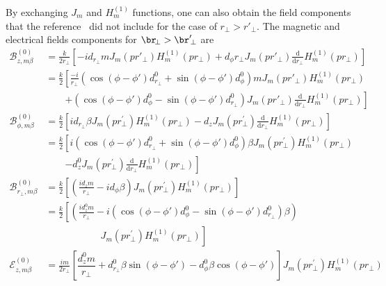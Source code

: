 \documentclass[]{report}
\begin{document}
By exchanging $J_m$ and $H_m^{(1)}$ functions, one can also obtain the field components that the reference~\cite{Klimov2004} did not include for the case of $ r\!_\perp>r'\!_\perp $. The magnetic and electrical fields components for $ \br\!_\perp>\br'\!_\perp $ are 
\begin{align}
\mathcal{B}_{z,m\beta}^{(0)} &= \frac{k}{2r\!_\perp}\left[-\! id_{r\!_\perp}m J_m(pr'\!\!_\perp)H_m^{(1)}(pr\!_\perp) \!+\! d_\phi r\!_\perp J_m(pr'\!_\perp) \frac{\mathrm{d}}{\mathrm{d}r\!_\perp}H_m^{(1)}(pr\!_\perp)\right]\\
&=\frac{k}{2}\left[\frac{-\! i}{r\!_\perp}\left(\cos(\phi\!-\!\phi')d^0_{r\!_\perp}\!\!+\!\sin(\phi\!-\!\phi')d^0_\phi\right)m J_m(pr'\!\!_\perp)H_m^{(1)}(pr\!_\perp)\right. \nonumber\\
&\quad\quad \left.+ \left(\cos(\phi\!-\!\phi')d^0_\phi\!-\!\sin(\phi\!-\!\phi')d^0_{r\!_\perp}\right)  J_m(pr'\!_\perp) \frac{\mathrm{d}}{\mathrm{d}r\!_\perp}H_m^{(1)}(pr\!_\perp)\right]\\
\mathcal{B}_{\phi,m\beta}^{(0)} &= \frac{k}{2}\left[ id_{r\!_\perp}\beta J_{m}\left( {pr\!_\perp^{\prime} }\right) H_{m}^{\left( {1}\right) }\left( pr\!_\perp \right)-d_z J_{m}\left( {pr\!_\perp^{\prime} }\right) \frac{\mathrm{d}}{\mathrm{d}r\!_\perp}H_{m}^{\left( {1}\right) }\left( pr\!_\perp \right) \right]\\
&=\frac{k}{2}\left[ i\left(\cos(\phi\!-\!\phi')d^0_{r\!_\perp}\!\!+\!\sin(\phi\!-\!\phi')d^0_\phi\right)\beta J_m\left( {pr\!_\perp^{\prime} }\right) H_m^{(1)}\left( pr\!_\perp \right)\phantom{\frac{d}{dr\!_\perp}}\right.\nonumber\\
&\quad\quad\left.-d^0_z J_m\left( {pr\!_\perp^{\prime} }\right) \frac{\mathrm{d}}{\mathrm{d}r\!_\perp}H_m^{(1)}\left( pr\!_\perp \right) \right]\\
\mathcal{B}_{r\!_\perp, m\beta}^{(0)} &= \frac{k}{2}\left[(\frac{id_z m}{r\!_\perp}- id_\phi \beta)J_{m}\left( {pr\!_\perp^{\prime} }\right) H_{m}^{\left( {1}\right) }\left( pr\!_\perp \right)   \right]\\
&= \frac{k}{2}\left[\left(\frac{id^0_z m}{r\!_\perp}- i\left(\cos(\phi\!-\!\phi')d^0_\phi\!-\!\sin(\phi\!-\!\phi')d^0_{r\!_\perp}\right) \beta\right)\right.\nonumber\\
&\qquad\qquad\left.\phantom{\frac{id^0_z m}{r\!_\perp}} J_m\left( {pr\!_\perp^{\prime} }\right)H_m^{(1)}\left( pr\!_\perp \right)   \right]\\
\mathcal{E}_{z,m\beta}^{(0)} 
&= \frac{im}{2r\!_\perp}\left[ \dfrac{d^0_z m}{r\!_\perp}+d^0_{r\!_\perp}\beta \sin(\phi\!-\!\phi')-d^0_\phi  \beta\cos(\phi\!-\!\phi')\right]J_m\left( {pr\!_\perp^{\prime} }\right) H_m^{(1)}\left( pr\!_\perp \right) \nonumber \\

\end{align}
\end{document}
